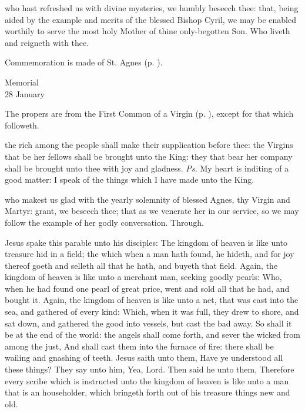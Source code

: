 \postcommunion
{} who hast refreshed us with divine mysteries, we humbly beseech thee: that, being aided by the example and merits of the blessed Bishop Cyril, we may be enabled worthily to serve the most holy Mother of thine only-begotten Son. Who liveth and reigneth with thee.

\begin{rubric}
    Commemoration is made of St. Agnes (p. \pageref{AgnesPostcommunionII}).
\end{rubric}


\begin{inhead}
    {Memorial\\
28 January}
\end{inhead}

\begin{rubric}
	The propers are from the First Common of a Virgin (p. \pageref{CommonVirginOnlyI}), except for that which followeth.
\end{rubric}

\introit
{} the rich among the people shall make their supplication before thee: the Virgins that be her fellows shall be brought unto the King: they that bear her company shall be brought unto thee with joy and gladness. \textit{Ps.} My heart is inditing of a good matter: I speak of the things which I have made unto the King.

\collect\label{AgnesCollectII}
 who makest us glad with the yearly solemnity of blessed Agnes, thy Virgin and Martyr: grant, we beseech thee; that as we venerate her in our service, so we may follow the example of her godly conversation. Through.

 Jesus spake this parable unto his disciples: The kingdom of heaven is like unto treasure hid in a field; the which when a man hath found, he hideth, and for joy thereof goeth and selleth all that he hath, and buyeth that field. Again, the kingdom of heaven is like unto a merchant man, seeking goodly pearls: Who, when he had found one pearl of great price, went and sold all that he had, and bought it. Again, the kingdom of heaven is like unto a net, that was cast into the sea, and gathered of every kind: Which, when it was full, they drew to shore, and sat down, and gathered the good into vessels, but cast the bad away. So shall it be at the end of the world: the angels shall come forth, and sever the wicked from among the just, And shall cast them into the furnace of fire: there shall be wailing and gnashing of teeth. Jesus saith unto them, Have ye understood all these things? They say unto him, Yea, Lord. Then said he unto them, Therefore every scribe which is instructed unto the kingdom of heaven is like unto a man that is an householder, which bringeth forth out of his treasure things new and old.


